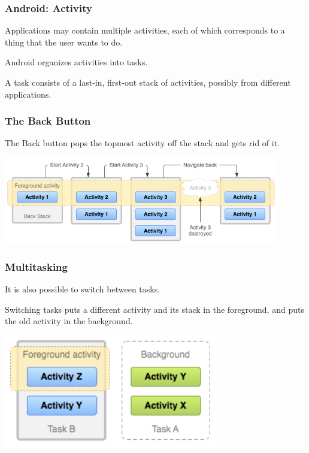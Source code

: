 \begin{frame}
\frametitle{Android: Activity}
\begin{changemargin}{1cm}

Applications may contain multiple activities, each of which
corresponds to a thing that the user wants to do.  

Android organizes
activities into tasks.  

A task consists of a last-in, first-out stack
of activities, possibly from different applications.

\end{changemargin}
\end{frame}


\begin{frame}
\frametitle{The Back Button}
\begin{changemargin}{1cm}

The Back button pops the topmost activity off the stack and gets rid of it.

\begin{center}
\includegraphics[width=0.9\textwidth]{images/diagram_backstack.png}
\end{center}

\end{changemargin}
\end{frame}

\begin{frame}
\frametitle{Multitasking}
\begin{changemargin}{1cm}

It is also possible to switch between tasks.

Switching tasks puts a different activity and its stack
in the foreground, and puts the old activity in the background.

\begin{center}
\includegraphics[width=0.7\textwidth]{images/diagram_multitasking}
\end{center}

\end{changemargin}
\end{frame}


